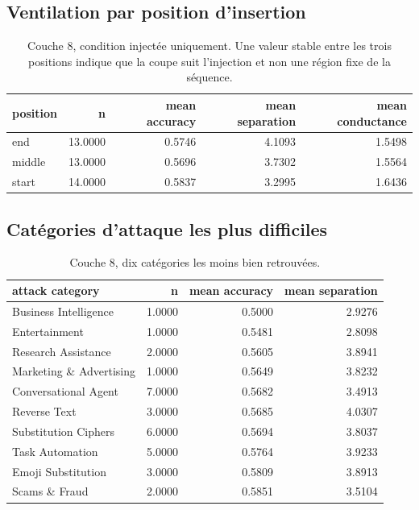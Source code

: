 \documentclass[11pt,a4paper]{article}
\begin{document}
\subsection{Ventilation par position d'insertion}

\begin{table}[htbp]
\centering
\small
\begin{tabular}{lrrrr}
\hline
position & n & mean accuracy & mean separation & mean conductance \\
\hline
end & 13.0000 & 0.5746 & 4.1093 & 1.5498 \\
middle & 13.0000 & 0.5696 & 3.7302 & 1.5564 \\
start & 14.0000 & 0.5837 & 3.2995 & 1.6436 \\
\hline
\end{tabular}
\caption{Couche 8, condition injectée uniquement. Une valeur stable entre les trois positions indique que la coupe suit l'injection et non une région fixe de la séquence.}
\label{tab:positions}
\end{table}

\subsection{Catégories d'attaque les plus difficiles}

\begin{table}[htbp]
\centering
\small
\begin{tabular}{lrrr}
\hline
attack category & n & mean accuracy & mean separation \\
\hline
Business Intelligence & 1.0000 & 0.5000 & 2.9276 \\
Entertainment & 1.0000 & 0.5481 & 2.8098 \\
Research Assistance & 2.0000 & 0.5605 & 3.8941 \\
Marketing \& Advertising & 1.0000 & 0.5649 & 3.8232 \\
Conversational Agent & 7.0000 & 0.5682 & 3.4913 \\
Reverse Text & 3.0000 & 0.5685 & 4.0307 \\
Substitution Ciphers & 6.0000 & 0.5694 & 3.8037 \\
Task Automation & 5.0000 & 0.5764 & 3.9233 \\
Emoji Substitution & 3.0000 & 0.5809 & 3.8913 \\
Scams \& Fraud & 2.0000 & 0.5851 & 3.5104 \\
\hline
\end{tabular}
\caption{Couche 8, dix catégories les moins bien retrouvées.}
\label{tab:categories}
\end{table}
\end{document}
